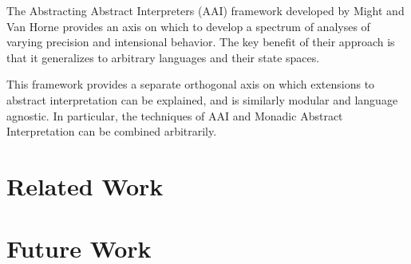 \documentclass{article}
\begin{document}
The Abstracting Abstract Interpreters (AAI) framework developed by Might and
Van Horne provides an axis on which to develop a spectrum of analyses of
varying precision and intensional behavior.
%
The key benefit of their approach is that it generalizes to arbitrary languages
and their state spaces.

This framework provides a separate orthogonal axis on which extensions to
abstract interpretation can be explained, and is similarly modular and language
agnostic.
%
In particular, the techniques of AAI and Monadic Abstract Interpretation can be
combined arbitrarily.


\section{Related Work}


\section{Future Work}
\end{document}
